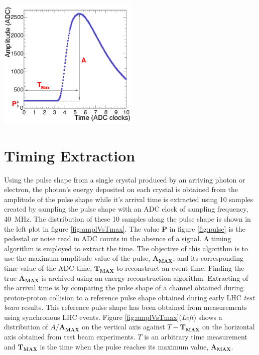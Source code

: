 \begin{center}
\centering
\mbox{\includegraphics[height=0.5\textwidth, width=0.5\textwidth]{THESISPLOTS/Time_Amplitude_Profile.png}}
\label{fig:pulse}
\end{center}

\section{Timing Extraction}

Using the pulse shape from a single crystal produced by an arriving photon or electron, the photon's energy deposited on each crystal is obtained from the amplitude of the pulse shape while it's arrival time is extracted using 10 samples created by sampling the pulse shape with an ADC clock of sampling frequency, 40~MHz. The distribution of these 10 samples along the pulse shape is shown in the left plot in figure \ref{fig:amplVsTmax}.  
The value \textbf{P} in figure \ref{fig:pulse} is the pedestal or noise read in ADC counts in the absence of a signal. 
A timing algorithm is employed to extract the time. The objective of this algorithm is to use the maximum amplitude value of the pulse, $\mathbf{A_{MAX}}$, and its corresponding time value of the ADC time, $\mathbf{T_{MAX}}$ to reconstruct an event time. 
Finding the true $\mathbf{A_{MAX}}$ is archived using an energy reconstruction algorithm.
Extracting of the arrival time is by comparing the pulse shape of a channel obtained during proton-proton collision to a reference pulse shape obtained during early LHC \textit{test beam} results.
This reference pulse shape has been obtained from  measurements using synchronous LHC events. Figure \ref{fig:amplVsTmax}(\textit{Left}) shows a distribution of $A/\mathbf{A_{MAX}}$ on the vertical axis against $T - \mathbf{T_{MAX}}$ on the horizontal axis obtained from test beam experiments. $T$ is an arbitrary time  measurement and $\mathbf{T_{MAX}}$ is the time when the  pulse reaches its maximum value, $\mathbf{A_{MAX}}$.


